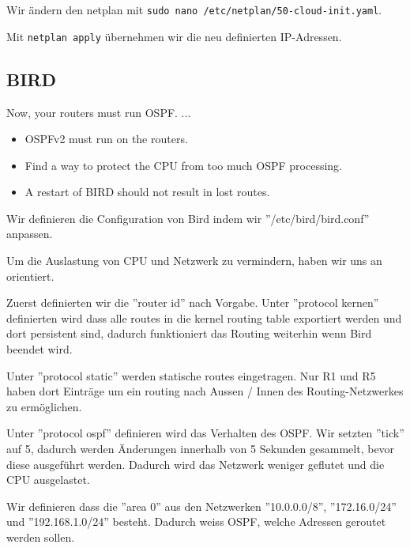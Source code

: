 \documentclass[11pt,titlepage]{article}
\newenvironment{shadedquotation}
 {\begin{shaded*}
  \quoting[leftmargin=0pt, vskip=0pt]
 }
 {\endquoting
 \end{shaded*}
}
\begin{document}
Wir ändern den netplan mit \lstinline!sudo nano /etc/netplan/50-cloud-init.yaml!.




Mit \lstinline!netplan apply! übernehmen wir die neu definierten IP-Adressen.

\subsection{BIRD}
\label{subsec:BIRD}
\begin{shadedquotation}
  Now, your routers must run OSPF. ...
  \begin{itemize}
    \item OSPFv2 must run on the routers.
    \item Find a way to protect the CPU from too much OSPF processing.
    \item A restart of BIRD should not result in lost routes.
  \end{itemize}
\end{shadedquotation}

Wir definieren die Configuration von Bird indem wir ''/etc/bird/bird.conf'' anpassen.

Um die Auslastung von CPU und Netzwerk zu vermindern, haben wir uns an \cite{ReducingBGP} orientiert.



Zuerst definierten wir die ''router id'' nach Vorgabe.
\medskip
Unter ''protocol kernen'' definierten wird dass alle routes in die kernel routing table exportiert werden und dort persistent sind, dadurch funktioniert das Routing weiterhin wenn Bird beendet wird.

\medskip
Unter ''protocol static'' werden statische routes eingetragen. Nur R1 und R5 haben dort Einträge um ein routing nach Aussen / Innen des Routing-Netzwerkes zu ermöglichen.

\medskip
Unter ''protocol ospf'' definieren wird das Verhalten des OSPF. Wir setzten ''tick'' auf 5, dadurch werden Änderungen innerhalb von 5 Sekunden gesammelt, bevor diese ausgeführt werden. Dadurch wird das Netzwerk weniger geflutet und die CPU ausgelastet.

Wir definieren dass die ''area 0'' aus den Netzwerken ''10.0.0.0/8'', ''172.16.0/24'' und ''192.168.1.0/24'' besteht. Dadurch weiss OSPF, welche Adressen geroutet werden sollen.
\end{document}
